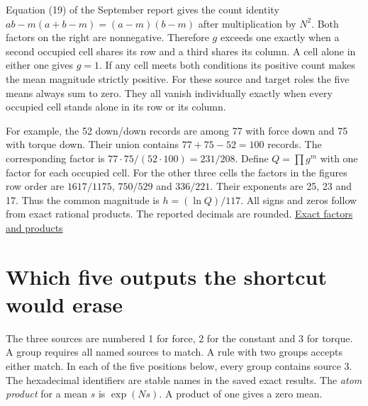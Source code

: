 Equation (19) of the September report gives the count identity \(ab-m(a+b-m)=(a-m)(b-m)\) after multiplication by \(N^2\). Both factors on the right are nonnegative. Therefore \(g\) exceeds one exactly when a second occupied cell shares its row and a third shares its column. A cell alone in either one gives \(g=1\). If any cell meets both conditions its positive count makes the mean magnitude strictly positive. For these source and target roles the five means always sum to zero. They all vanish individually exactly when every occupied cell stands alone in its row or its column.

For example, the 52 down/down records are among 77 with force down and 75 with torque down. Their union contains \(77+75-52=100\) records. The corresponding factor is \(77\cdot75/(52\cdot100)=231/208\). Define \(Q=\prod g^m\) with one factor for each occupied cell. For the other three cells the factors in the figure\textquotesingle s row order are \(1617/1175\), \(750/529\) and \(336/221\). Their exponents are 25, 23 and 17. Thus the common magnitude is \(h=(\ln Q)/117\). All signs and zeros follow from exact rational products. The reported decimals are rounded. \href{https://github.com/sepahead/pid-rs/blob/main/audit/research/robot-wrist-copied-target/checked/support-ordinary.json}{Exact factors and products}

\clearpage

\section{Which five outputs the shortcut would erase}\label{which-five-outputs-the-shortcut-would-erase}

The three sources are numbered 1 for force, 2 for the constant and 3 for torque. A group requires all named sources to match. A rule with two groups accepts either match. In each of the five positions below, every group contains source 3. The hexadecimal identifiers are stable names in the saved exact results. The \emph{atom product} for a mean \(s\) is \(\exp(Ns)\). A product of one gives a zero mean.

